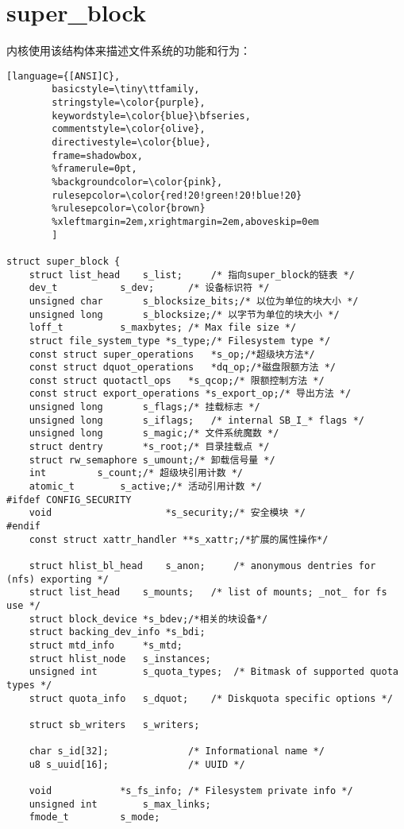 \section{super\_block}

	内核使用该结构体来描述文件系统的功能和行为：

\begin{lstlisting}[language={[ANSI]C},
        basicstyle=\tiny\ttfamily,
        stringstyle=\color{purple},
        keywordstyle=\color{blue}\bfseries,
        commentstyle=\color{olive},
        directivestyle=\color{blue},
        frame=shadowbox,
        %framerule=0pt,
        %backgroundcolor=\color{pink},
        rulesepcolor=\color{red!20!green!20!blue!20}
        %rulesepcolor=\color{brown}
        %xleftmargin=2em,xrightmargin=2em,aboveskip=0em
        ]
        
struct super_block {
	struct list_head	s_list;		/* 指向super_block的链表 */
	dev_t			s_dev;		/* 设备标识符 */
	unsigned char		s_blocksize_bits;/* 以位为单位的块大小 */
	unsigned long		s_blocksize;/* 以字节为单位的块大小 */
	loff_t			s_maxbytes;	/* Max file size */
	struct file_system_type	*s_type;/* Filesystem type */
	const struct super_operations	*s_op;/*超级块方法*/
	const struct dquot_operations	*dq_op;/*磁盘限额方法 */
	const struct quotactl_ops	*s_qcop;/* 限额控制方法 */
	const struct export_operations *s_export_op;/* 导出方法 */
	unsigned long		s_flags;/* 挂载标志 */
	unsigned long		s_iflags;	/* internal SB_I_* flags */
	unsigned long		s_magic;/* 文件系统魔数 */
	struct dentry		*s_root;/* 目录挂载点 */
	struct rw_semaphore	s_umount;/* 卸载信号量 */
	int			s_count;/* 超级块引用计数 */
	atomic_t		s_active;/* 活动引用计数 */
#ifdef CONFIG_SECURITY
	void                    *s_security;/* 安全模块 */
#endif
	const struct xattr_handler **s_xattr;/*扩展的属性操作*/

	struct hlist_bl_head	s_anon;		/* anonymous dentries for (nfs) exporting */
	struct list_head	s_mounts;	/* list of mounts; _not_ for fs use */
	struct block_device	*s_bdev;/*相关的块设备*/
	struct backing_dev_info *s_bdi;
	struct mtd_info		*s_mtd;
	struct hlist_node	s_instances;
	unsigned int		s_quota_types;	/* Bitmask of supported quota types */
	struct quota_info	s_dquot;	/* Diskquota specific options */

	struct sb_writers	s_writers;

	char s_id[32];				/* Informational name */
	u8 s_uuid[16];				/* UUID */

	void 			*s_fs_info;	/* Filesystem private info */
	unsigned int		s_max_links;
	fmode_t			s_mode;


\end{lstlisting}
